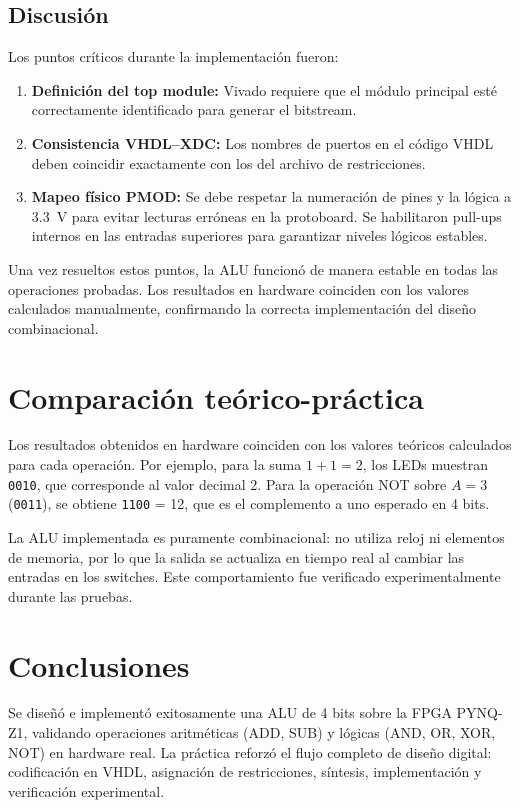 \documentclass[12pt,letterpaper]{article}
\begin{document}
\subsection{Discusión}
Los puntos críticos durante la implementación fueron:
\begin{enumerate}
  \item \textbf{Definición del top module:} Vivado requiere que el módulo principal esté correctamente identificado para generar el bitstream.
  \item \textbf{Consistencia VHDL--XDC:} Los nombres de puertos en el código VHDL deben coincidir exactamente con los del archivo de restricciones.
  \item \textbf{Mapeo físico PMOD:} Se debe respetar la numeración de pines y la lógica a \SI{3.3}{\volt} para evitar lecturas erróneas en la protoboard. Se habilitaron pull-ups internos en las entradas superiores para garantizar niveles lógicos estables.
\end{enumerate}

Una vez resueltos estos puntos, la ALU funcionó de manera estable en todas las operaciones probadas.
Los resultados en hardware coinciden con los valores calculados manualmente, confirmando la correcta implementación del diseño combinacional.

\section{Comparación teórico-práctica}
Los resultados obtenidos en hardware coinciden con los valores teóricos calculados para cada operación.
Por ejemplo, para la suma $1 + 1 = 2$, los LEDs muestran \texttt{0010}, que corresponde al valor decimal 2.
Para la operación NOT sobre $A = 3$ (\texttt{0011}), se obtiene \texttt{1100} = 12, que es el complemento a uno esperado en 4 bits.

La ALU implementada es puramente combinacional: no utiliza reloj ni elementos de memoria, por lo que la salida se actualiza en tiempo real al cambiar las entradas en los switches.
Este comportamiento fue verificado experimentalmente durante las pruebas.

\section{Conclusiones}
Se diseñó e implementó exitosamente una ALU de 4 bits sobre la FPGA PYNQ-Z1, validando operaciones aritméticas (ADD, SUB) y lógicas (AND, OR, XOR, NOT) en hardware real.
La práctica reforzó el flujo completo de diseño digital: codificación en VHDL, asignación de restricciones, síntesis, implementación y verificación experimental.
\end{document}
